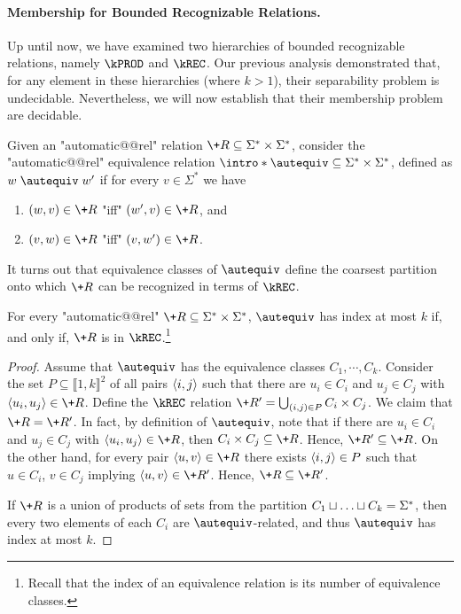 \paragraph*{Membership for Bounded Recognizable Relations.}
Up until now, we have examined two hierarchies of bounded recognizable relations, namely $\kPROD$ and $\kREC$. 
Our previous analysis demonstrated that, for any element in these hierarchies (where $k>1$), their separability problem is undecidable. Nevertheless, 
we will now establish that their membership problem are decidable.

\AP Given an "automatic@@rel" relation $\+R \subseteq \Sigma^* \times \Sigma^*$, consider the "automatic@@rel" equivalence relation $\intro*\autequiv \subseteq \Sigma^* \times \Sigma^*$, defined as $w \mathrel{\autequiv} w'$ if for every $v \in \Sigma^*$ we have 
\begin{enumerate}
    \item $(w,v) \in \+R$ "iff" $(w',v) \in \+R$, and
    \item $(v,w) \in \+R$ "iff" $(v,w') \in \+R$.
\end{enumerate}

It turns out that equivalence classes of $\autequiv$ define the coarsest partition onto which $\+R$ can be recognized in terms of $\kREC$.

\begin{lemma}\AP\label{lem:krec-characterization}
    For every "automatic@@rel" $\+R \subseteq \Sigma^* \times \Sigma^*$, $\autequiv$ has index at most $k$ if, and only if, $\+R$ is in $\kREC$.\footnote{Recall that the index of an equivalence relation is its number of equivalence classes.}
\end{lemma}
\begin{proof}
    Assume that $\autequiv$ has the equivalence classes $C_1, \cdots, C_k$. Consider the set $P \subseteq \lBrack 1,k\rBrack^2$ of all pairs $\langle i,j\rangle$ such that there are $u_i \in C_i$ and $u_j \in C_j$ with $\tup{u_i,u_j} \in \+R$. Define the $\kREC$ relation $\+R' = \bigcup_{(i,j) \in P} C_i \times C_j$. We claim that $\+R=\+R'$. 
    In fact, by definition of $\autequiv$, note that if there are $u_i \in C_i$ and $u_j \in C_j$ with $\tup{u_i,u_j} \in \+R$, then $C_i \times C_j \subseteq \+R$. Hence, $\+R' \subseteq \+R$.
    On the other hand, for every pair $\tup{u,v} \in \+R$ there exists $\langle i,j\rangle \in P$ such that $u \in C_i$, $v \in C_j$ implying $\tup{u,v} \in \+R'$.
    Hence, $\+R \subseteq \+R'$.

    If $\+R$ is a union of products of sets from the partition $C_1 \sqcup \hdots \sqcup C_k = \Sigma^*$, then every two elements of each $C_i$ are $\autequiv$-related, and thus $\autequiv$ has index at most $k$.
\end{proof}

